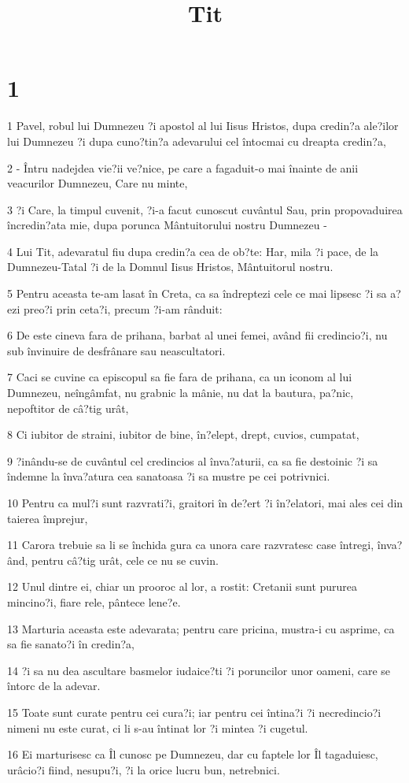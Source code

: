 

\title{Tit}


\chapter{1}

\par 1 Pavel, robul lui Dumnezeu ?i apostol al lui Iisus Hristos, dupa credin?a ale?ilor lui Dumnezeu ?i dupa cuno?tin?a adevarului cel întocmai cu dreapta credin?a,
\par 2 - Întru nadejdea vie?ii ve?nice, pe care a fagaduit-o mai înainte de anii veacurilor Dumnezeu, Care nu minte,
\par 3 ?i Care, la timpul cuvenit, ?i-a facut cunoscut cuvântul Sau, prin propovaduirea încredin?ata mie, dupa porunca Mântuitorului nostru Dumnezeu -
\par 4 Lui Tit, adevaratul fiu dupa credin?a cea de ob?te: Har, mila ?i pace, de la Dumnezeu-Tatal ?i de la Domnul Iisus Hristos, Mântuitorul nostru.
\par 5 Pentru aceasta te-am lasat în Creta, ca sa îndreptezi cele ce mai lipsesc ?i sa a?ezi preo?i prin ceta?i, precum ?i-am rânduit:
\par 6 De este cineva fara de prihana, barbat al unei femei, având fii credincio?i, nu sub învinuire de desfrânare sau neascultatori.
\par 7 Caci se cuvine ca episcopul sa fie fara de prihana, ca un iconom al lui Dumnezeu, neîngâmfat, nu grabnic la mânie, nu dat la bautura, pa?nic, nepoftitor de câ?tig urât,
\par 8 Ci iubitor de straini, iubitor de bine, în?elept, drept, cuvios, cumpatat,
\par 9 ?inându-se de cuvântul cel credincios al înva?aturii, ca sa fie destoinic ?i sa îndemne la înva?atura cea sanatoasa ?i sa mustre pe cei potrivnici.
\par 10 Pentru ca mul?i sunt razvrati?i, graitori în de?ert ?i în?elatori, mai ales cei din taierea împrejur,
\par 11 Carora trebuie sa li se închida gura ca unora care razvratesc case întregi, înva?ând, pentru câ?tig urât, cele ce nu se cuvin.
\par 12 Unul dintre ei, chiar un prooroc al lor, a rostit: Cretanii sunt pururea mincino?i, fiare rele, pântece lene?e.
\par 13 Marturia aceasta este adevarata; pentru care pricina, mustra-i cu asprime, ca sa fie sanato?i în credin?a,
\par 14 ?i sa nu dea ascultare basmelor iudaice?ti ?i poruncilor unor oameni, care se întorc de la adevar.
\par 15 Toate sunt curate pentru cei cura?i; iar pentru cei întina?i ?i necredincio?i nimeni nu este curat, ci li s-au întinat lor ?i mintea ?i cugetul.
\par 16 Ei marturisesc ca Îl cunosc pe Dumnezeu, dar cu faptele lor Îl tagaduiesc, urâcio?i fiind, nesupu?i, ?i la orice lucru bun, netrebnici.

